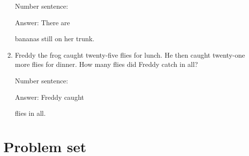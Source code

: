 \documentclass{tufte-book}
\begin{document}
\begin{enumerate}
  Number sentence:
  \dotfill\medskip\par
  Answer: There are
  \dotfill\medskip\par\mbox{}\dotfill\medskip\par\mbox{}\dotfill\bigskip
  bananas still on her trunk.
\item
  Freddy the frog caught twenty-five flies for lunch. He then caught
  twenty-one more flies for dinner. How many flies did Freddy catch in
  all?\medskip\par
  Number sentence:
  \dotfill\medskip\par
  Answer: Freddy caught
  \dotfill\medskip\par\mbox{}\dotfill\medskip\par\mbox{}\dotfill\bigskip
  flies in all.
\end{enumerate}



\clearpage\section{Problem set }
\end{document}
